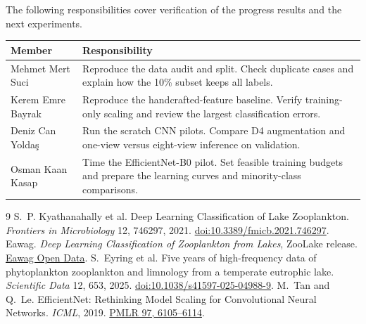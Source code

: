 \documentclass[11pt,a4paper]{article}
\newcommand{\sectiontitle}[1]{\vspace{4pt}{\large\sffamily\bfseries\color{ink}#1}\par}
\begin{document}
\sectiontitle{7 \quad Workload distribution}
The following responsibilities cover verification of the progress results and the next experiments.

{\small\setlength{\tabcolsep}{5pt}
\begin{tabular}{@{}p{37mm}p{124mm}@{}}
\toprule
\textbf{Member} & \textbf{Responsibility} \\
\midrule
Mehmet Mert Suci & Reproduce the data audit and split. Check duplicate cases and explain how the 10\% subset keeps all labels. \\
Kerem Emre Bayrak & Reproduce the handcrafted-feature baseline. Verify training-only scaling and review the largest classification errors. \\
Deniz Can Yoldaş & Run the scratch CNN pilots. Compare D4 augmentation and one-view versus eight-view inference on validation. \\
Osman Kaan Kasap & Time the EfficientNet-B0 pilot. Set feasible training budgets and prepare the learning curves and minority-class comparisons. \\
\bottomrule
\end{tabular}
\par}

\vspace{-2pt}
{\small
\renewcommand{\refname}{\large\sffamily References}
\begin{thebibliography}{9}
\setlength{\itemsep}{1pt}
 S.\ P. Kyathanahally et al. Deep Learning Classification of Lake Zooplankton. \textit{Frontiers in Microbiology} 12, 746297, 2021. \href{https://doi.org/10.3389/fmicb.2021.746297}{doi:10.3389/fmicb.2021.746297}.
 Eawag. \textit{Deep Learning Classification of Zooplankton from Lakes}, ZooLake release. \href{https://opendata.eawag.ch/dataset/52b6ba86-5ecb-448c-8c01-eec7cb209dc7}{Eawag Open Data}.
 S.\ Eyring et al. Five years of high-frequency data of phytoplankton zooplankton and limnology from a temperate eutrophic lake. \textit{Scientific Data} 12, 653, 2025. \href{https://doi.org/10.1038/s41597-025-04988-9}{doi:10.1038/s41597-025-04988-9}.
 M.\ Tan and Q.\ Le. EfficientNet: Rethinking Model Scaling for Convolutional Neural Networks. \textit{ICML}, 2019. \href{https://proceedings.mlr.press/v97/tan19a.html}{PMLR 97, 6105--6114}.
\end{thebibliography}
}
\end{document}
